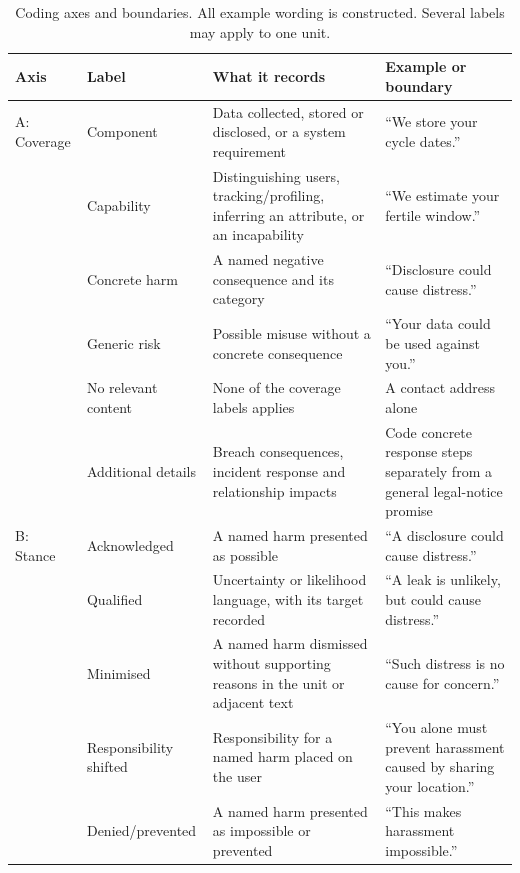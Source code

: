 \begin{table}[t]
\centering
\begin{singlespace}
\caption[Coding axes and boundaries]{Coding axes and boundaries. All example wording is constructed.
Several labels may apply to one unit.}
\label{tab:axes}
\small
\setlength{\aboverulesep}{0.25ex}\setlength{\belowrulesep}{0.35ex}
\begin{tabularx}{\textwidth}{@{}L{1.6cm}L{2.8cm}>{\raggedright\arraybackslash}X>{\raggedright\arraybackslash}X@{}}
\toprule
\textbf{Axis} & \textbf{Label} & \textbf{What it records} & \textbf{Example or boundary} \\
\midrule
A: Coverage & Component & Data collected, stored or disclosed, or a system requirement
  & \enquote{We store your cycle dates.} \\
\rowrule
 & Capability & Distinguishing users, tracking/profiling, inferring an attribute, or an incapability
  & \enquote{We estimate your fertile window.} \\
\rowrule
 & Concrete harm & A named negative consequence and its category
  & \enquote{Disclosure could cause distress.} \\
\rowrule
 & Generic risk & Possible misuse without a concrete consequence
  & \enquote{Your data could be used against you.} \\
\rowrule
 & No relevant content & None of the coverage labels applies
  & A contact address alone \\
\rowrule
 & Additional details & Breach consequences, incident response and relationship impacts
  & Code concrete response steps separately from a general legal-notice promise \\
\midrule
B: Stance & Acknowledged & A named harm presented as possible
  & \enquote{A disclosure could cause distress.} \\
\rowrule
 & Qualified & Uncertainty or likelihood language, with its target recorded
  & \enquote{A leak is unlikely, but could cause distress.} \\
\rowrule
 & Minimised & A named harm dismissed without supporting reasons in the unit or adjacent text
  & \enquote{Such distress is no cause for concern.} \\
\rowrule
 & Responsibility shifted & Responsibility for a named harm placed on the user
  & \enquote{You alone must prevent harassment caused by sharing your location.} \\
\rowrule
 & Denied/prevented & A named harm presented as impossible or prevented
  & \enquote{This makes harassment impossible.} \\

\end{tabularx}
\end{singlespace}
\end{table}
